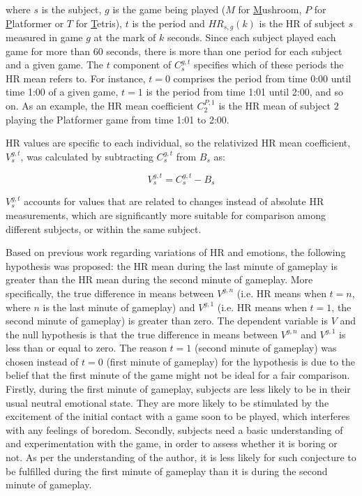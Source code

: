 where $s$ is the subject, $g$ is the game being played ($M$ for \underline{M}ushroom, $P$ for \underline{P}latformer or $T$ for \underline{T}etris), $t$ is the period and $HR_{s,g}(k)$ is the HR of subject $s$ measured in game $g$ at the mark of $k$ seconds. Since each subject played each game for more than 60 seconds, there is more than one period for each subject and a given game. The $t$ component of $C_s^{g,t}$ specifies which of these periods the HR mean refers to. For instance, $t=0$ comprises the period from time 0:00 until time 1:00 of a given game, $t=1$ is the period from time 1:01 until 2:00, and so on. As an example, the HR mean coefficient $C_2^{P,1}$ is the HR mean of subject $2$ playing the Platformer game from time 1:01 to 2:00.

HR values are specific to each individual, so the relativized HR mean coefficient, $V_s^{g,t}$, was calculated by subtracting $C_s^{g,t}$ from $B_s$ as:

\begin{equation} \label{eq:variation-normalized}
V_s^{g,t} = C_s^{g,t} - B_s
\end{equation}

$V_s^{g,t}$ accounts for values that are related to changes instead of absolute HR measurements, which are significantly more suitable for comparison among different subjects, or within the same subject.

Based on previous work regarding variations of HR and emotions, the following hypothesis was proposed: the HR mean during the last minute of gameplay is greater than the HR mean during the second minute of gameplay. More specifically, the true difference in means between $V^{g,n}$ (i.e. HR means when $t=n$, where $n$ is the last minute of gameplay) and $V^{g,1}$ (i.e. HR means when $t=1$, the second minute of gameplay) is greater than zero. The dependent variable is $V$ and the null hypothesis is that the true difference in means between $V^{g,n}$ and $V^{g,1}$ is less than or equal to zero. The reason $t=1$ (second minute of gameplay) was chosen instead of $t=0$ (first minute of gameplay) for the hypothesis is due to the belief that the first minute of the game might not be ideal for a fair comparison. Firstly, during the first minute of gameplay, subjects are less likely to be in their usual neutral emotional state. They are more likely to be stimulated by the excitement of the initial contact with a game soon to be played, which interferes with any feelings of boredom. Secondly, subjects need a basic understanding of and experimentation with the game, in order to assess whether it is boring or not. As per the understanding of the author, it is less likely for such conjecture to be fulfilled during the first minute of gameplay than it is during the second minute of gameplay.

